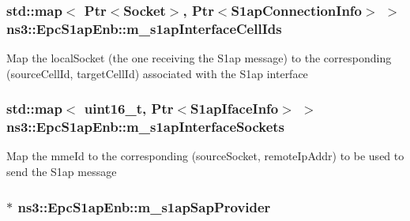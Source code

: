 \subsubsection[{\texorpdfstring{m\+\_\+s1ap\+Interface\+Cell\+Ids}{m_s1apInterfaceCellIds}}]{\setlength{\rightskip}{0pt plus 5cm}std\+::map$<$ {\bf Ptr}$<${\bf Socket}$>$, {\bf Ptr}$<${\bf S1ap\+Connection\+Info}$>$ $>$ ns3\+::\+Epc\+S1ap\+Enb\+::m\+\_\+s1ap\+Interface\+Cell\+Ids\hspace{0.3cm}{\ttfamily [private]}}\hypertarget{classns3_1_1EpcS1apEnb_aea3453f0d052d6ff2874b482f26c1552}{}\label{classns3_1_1EpcS1apEnb_aea3453f0d052d6ff2874b482f26c1552}
Map the local\+Socket (the one receiving the S1ap message) to the corresponding (source\+Cell\+Id, target\+Cell\+Id) associated with the S1ap interface 
\subsubsection[{\texorpdfstring{m\+\_\+s1ap\+Interface\+Sockets}{m_s1apInterfaceSockets}}]{\setlength{\rightskip}{0pt plus 5cm}std\+::map$<$ uint16\+\_\+t, {\bf Ptr}$<${\bf S1ap\+Iface\+Info}$>$ $>$ ns3\+::\+Epc\+S1ap\+Enb\+::m\+\_\+s1ap\+Interface\+Sockets\hspace{0.3cm}{\ttfamily [private]}}\hypertarget{classns3_1_1EpcS1apEnb_ad91b3139b21bd084edf401249d4e4233}{}\label{classns3_1_1EpcS1apEnb_ad91b3139b21bd084edf401249d4e4233}
Map the mme\+Id to the corresponding (source\+Socket, remote\+Ip\+Addr) to be used to send the S1ap message 
\subsubsection[{\texorpdfstring{m\+\_\+s1ap\+Sap\+Provider}{m_s1apSapProvider}}]{$\ast$ ns3\+::\+Epc\+S1ap\+Enb\+::m\+\_\+s1ap\+Sap\+Provider\hspace{0.3cm}{\ttfamily [protected]}}\hypertarget{classns3_1_1EpcS1apEnb_ad8cce380561baf7c8463e34f090580cf}{}\label{classns3_1_1EpcS1apEnb_ad8cce380561baf7c8463e34f090580cf}
